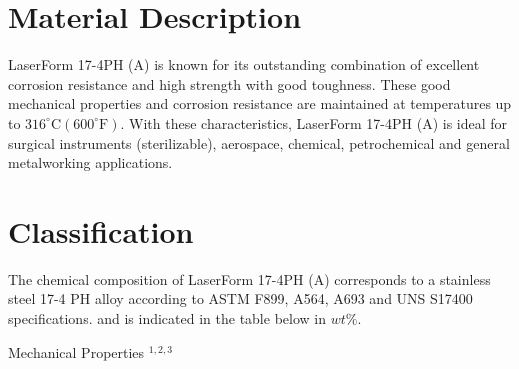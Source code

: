 \documentclass[10pt]{article}
\begin{document}
\section*{Material Description}
LaserForm 17-4PH (A) is known for its outstanding combination of excellent corrosion resistance and high strength with good toughness. These good mechanical properties and corrosion resistance are maintained at temperatures up to $316^{\circ} \mathrm{C}\left(600^{\circ} \mathrm{F}\right)$. With these characteristics, LaserForm 17-4PH (A) is ideal for surgical instruments (sterilizable), aerospace, chemical, petrochemical and general metalworking applications.

\section*{Classification}
The chemical composition of LaserForm 17-4PH (A) corresponds to a stainless steel 17-4 PH alloy according to ASTM F899, A564, A693 and UNS S17400 specifications. and is indicated in the table below in $w t \%$.

Mechanical Properties ${ }^{1,2,3}$
\end{document}
